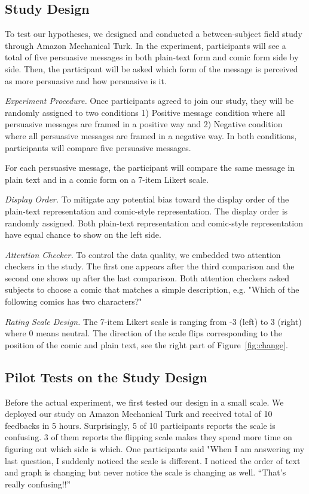 \subsection{Study Design}
To test our hypotheses, we designed and conducted a between-subject field study through Amazon Mechanical Turk. In the experiment, participants will see a total of five persuasive messages in both plain-text form and comic form side by side. Then, the participant will be asked which form of the message is perceived as more persuasive and how persuasive is it.\par
\textit{Experiment Procedure.} Once participants agreed to join our study, they will be randomly assigned to two conditions 1) Positive message condition where all persuasive messages are framed in a positive way and 2) Negative condition where all persuasive messages are framed in a negative way. In both conditions, participants will compare five persuasive messages.\par
For each persuasive message, the participant will compare the same message in plain text and in a comic form on a 7-item Likert scale. \par
\textit{Display Order.} To mitigate any potential bias toward the display order of the plain-text representation and comic-style representation. The display order is randomly assigned. Both plain-text representation and comic-style representation have equal chance to show on the left side.\par
\textit{Attention Checker.} To control the data quality, we embedded two attention checkers in the study. The first one appears after the third comparison and the second one shows up after the last comparison. Both attention checkers asked subjects to choose a comic that matches a simple description, e.g. "Which of the following comics has two characters?"\par
\textit{Rating Scale Design.} The 7-item Likert scale is ranging from -3 (left) to 3 (right) where 0 means neutral. The direction of the scale flips corresponding to the position of the comic and plain text, see the right part of Figure~\ref{fig:change}. \par

\subsection{Pilot Tests on the Study Design}
Before the actual experiment, we first tested our design in a small scale. We deployed our study on Amazon Mechanical Turk and received total of 10 feedbacks in 5 hours. Surprisingly, 5 of 10 participants reports the scale is confusing. 3 of them reports the flipping scale makes they spend more time on figuring out which side is which. One participants said "When I am answering my last question, I suddenly noticed the scale is different. I noticed the order of text and graph is changing but never notice the scale is changing as well. ``That's really confusing!!''\par

